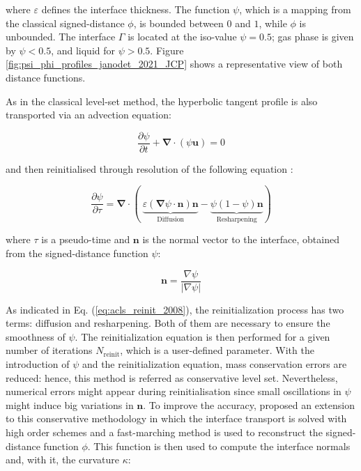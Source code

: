 where $\varepsilon$ defines the interface thickness. The function $\psi$, which is a mapping from the classical signed-distance $\phi$, is bounded between $0$ and $1$, while $\phi$ is unbounded. The interface $\Gamma$ is located at the iso-value $\psi = 0.5$; gas phase is given by $\psi < 0.5$, and liquid for $\psi > 0.5$. Figure \ref{fig:psi_phi_profiles_janodet_2021_JCP} shows a representative view of both distance functions.

As in the classical level-set method, the hyperbolic tangent profile is also transported via an advection equation:

\begin{equation}
    \frac{\partial \psi}{\partial t} + \boldsymbol{\nabla} \cdot \left( \psi \textbf{u} \right) = 0
\end{equation}

and then reinitialised through resolution of the following equation :


\begin{equation}
\label{eq:acls_reinit_2008}
\frac{\partial\psi}{\partial \tau}=\boldsymbol{\nabla}\cdot(\ \underbrace{\varepsilon(\boldsymbol{\nabla}\psi\cdot\textbf{n})\textbf{n}}_{\mathrm{Diffusion}}-\underbrace{\psi(1-\psi)\textbf{n}}_{\mathrm{Resharpening}})
\end{equation}

where $\tau$ is a pseudo-time and $\textbf{n}$ is the normal vector to the interface, obtained from the signed-distance function $\psi$:

\begin{equation}
\textbf{n} = \frac{\nabla \psi}{| \nabla \psi |} 
\end{equation}


As indicated in Eq. (\ref{eq:acls_reinit_2008}), the reinitialization process has two terms: diffusion and resharpening. Both of them are necessary to ensure the smoothness of $\psi$. The reinitialization equation is then performed for a given number of iterations $N_\mathrm{reinit}$, which is a user-defined parameter. With the introduction of $\psi$ and the reinitialization equation, mass conservation errors are reduced: hence, this method is referred as conservative level set. Nevertheless, numerical errors might appear during reinitialisation since small oscillations in $\psi$ might induce big variations in $\textbf{n}$. To improve the accuracy,  proposed an extension to this conservative methodology in which the interface transport is solved with high order schemes and a fast-marching method is used to reconstruct the signed-distance function $\phi$. This function is then used to compute the interface normals and, with it, the curvature $\kappa$: 

